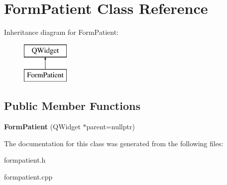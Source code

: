 \hypertarget{class_form_patient}{}\section{Form\+Patient Class Reference}
\label{class_form_patient}
Inheritance diagram for Form\+Patient\+:\begin{figure}[H]
\begin{center}
\leavevmode
\includegraphics[height=2.000000cm]{class_form_patient}
\end{center}
\end{figure}
\subsection*{Public Member Functions}
\begin{DoxyCompactItemize}
\item 
\mbox{\label{class_form_patient_a3691c5c7b46b2de05fae51808ebabb7b}} 
{\bfseries Form\+Patient} (Q\+Widget $\ast$parent=nullptr)
\end{DoxyCompactItemize}


The documentation for this class was generated from the following files\+:\begin{DoxyCompactItemize}
\item 
formpatient.\+h\item 
formpatient.\+cpp\end{DoxyCompactItemize}
